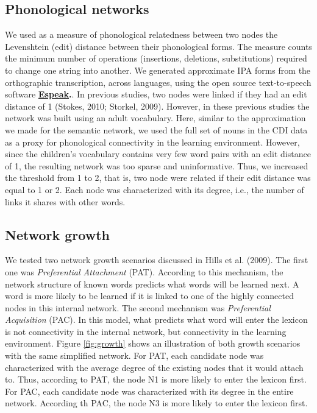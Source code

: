 \documentclass[10pt, letterpaper]{article}
\begin{document}
\subsection{Phonological networks}\label{phonological-networks}

We used as a measure of phonological relatedness between two nodes the
Levenshtein (edit) distance between their phonological forms. The
measure counts the minimum number of operations (insertions, deletions,
substitutions) required to change one string into another. We generated
approximate IPA forms from the orthographic transcription, across
languages, using the open source text-to-speech software
\textbf{\href{http://http://espeak.sourceforge.net/}{Espeak}.}. In
previous studies, two nodes were linked if they had an edit distance of
1 (Stokes, 2010; Storkel, 2009). However, in these previous studies the
network was built using an adult vocabulary. Here, similar to the
approximation we made for the semantic network, we used the full set of
nouns in the CDI data as a proxy for phonological connectivity in the
learning environment. However, since the children's vocabulary contains
very few word pairs with an edit distance of 1, the resulting network
was too sparse and uninformative. Thus, we increased the threshold from
1 to 2, that is, two node were related if their edit distance was equal
to 1 or 2. Each node was characterized with its degree, i.e., the number
of links it shares with other words.

\subsection{Network growth}\label{network-growth}

We tested two network growth scenarios discussed in Hills et al. (2009).
The first one was \emph{Preferential Attachment} (PAT). According to
this mechanism, the network structure of known words predicts what words
will be learned next. A word is more likely to be learned if it is
linked to one of the highly connected nodes in this internal network.
The second mechanism was \emph{Preferential Acquisition} (PAC). In this
model, what predicts what word will enter the lexicon is not
connectivity in the internal network, but connectivity in the learning
environment. Figure \ref{fig:growth} shows an illustration of both
growth scenarios with the same simplified network. For PAT, each
candidate node was characterized with the average degree of the existing
nodes that it would attach to. Thus, according to PAT, the node N1 is
more likely to enter the lexicon first. For PAC, each candidate node was
characterized with its degree in the entire network. According th PAC,
the node N3 is more likely to enter the lexicon first.
\end{document}
